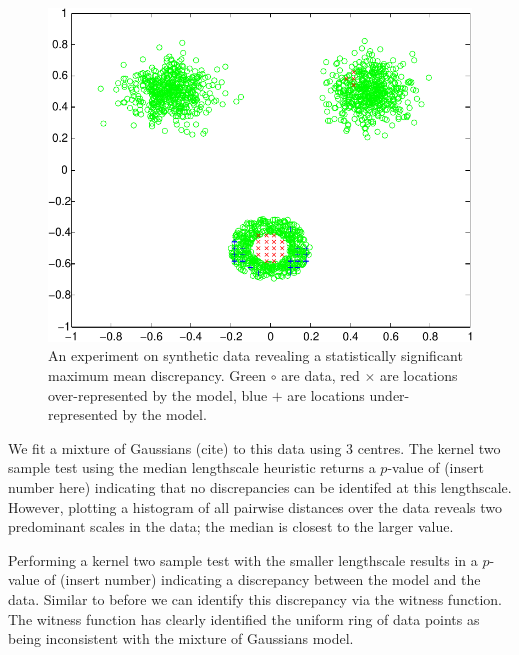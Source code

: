 \documentclass{article} %
\begin{document}
\begin{figure}[ht]
\centering
\includegraphics[width=0.98\columnwidth]{figures/blob_blob_ring}
\caption{
An experiment on synthetic data revealing a statistically significant maximum mean discrepancy.
Green $\circ$ are data, red $\times$ are locations over-represented by the model, blue $+$ are locations under-represented by the model.
}
\label{fig:blob_blob_ring}
\end{figure}

We fit a mixture of Gaussians (cite) to this data using 3 centres.
The kernel two sample test using the median lengthscale heuristic returns a $p$-value of (insert number here) indicating that no discrepancies can be identifed at this lengthscale.
However, plotting a histogram of all pairwise distances over the data reveals two predominant scales in the data; the median is closest to the larger value.

Performing a kernel two sample test with the smaller lengthscale results in a $p$-value of (insert number) indicating a discrepancy between the model and the data.
Similar to before we can identify this discrepancy via the witness function.
The witness function has clearly identified the uniform ring of data points as being inconsistent with the mixture of Gaussians model.

\end{document}
